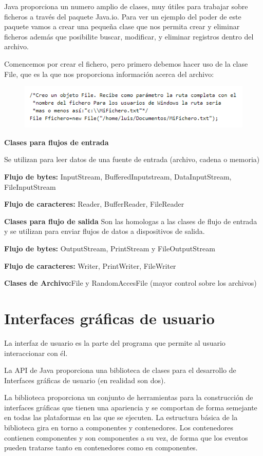 \documentclass[12pt,a4paper]{report}
\begin{document}
{Java proporciona un numero amplio de clases, muy útiles para trabajar sobre ficheros a través del paquete Java.io. Para ver un ejemplo del poder de este paquete vamos a crear una pequeña clase que nos permita crear y eliminar  ficheros además que posibilite buscar, modificar, y eliminar registros dentro del archivo.

Comencemos por crear el fichero, pero primero debemos hacer uso de la clase File, que es la que nos proporciona información acerca del archivo: 
\begin{figure}[hbtp]
\centering
\includegraphics[scale=1]{archivo.PNG}
\end{figure}

\textbf{Clases para flujos de entrada }

Se utilizan para leer datos de una fuente de entrada (archivo, cadena o memoria)

\textbf{Flujo de bytes:} InputStream, BufferedInputstream, DataInputStream, FileInputStream

\textbf{Flujo de caracteres:} Reader, BufferReader, FileReader
\bigskip 

\textbf{Clases para flujo de salida}
Son las homologas a las clases de flujo de entrada y se utilizan para enviar flujos de datos a dispositivos de salida.

\textbf{Flujo de bytes:} OutputStream, PrintStream y FileOutputStream

\textbf{Flujo de caracteres:} Writer, PrintWriter, FileWriter

\textbf{Clases de Archivo:}File y RandomAccesFile (mayor control sobre los archivos)

\section*{Interfaces gráficas de usuario}
La interfaz de usuario es la parte del programa que permite al usuario interaccionar con él. 

La API de Java proporciona una biblioteca de clases para el desarrollo de Interfaces gráficas de usuario (en realidad son dos). 

La biblioteca proporciona un conjunto de herramientas para la construcción de interfaces gráficas que tienen una apariencia y se comportan de forma semejante en todas las plataformas en las que se ejecuten.
 La estructura básica de la biblioteca gira en torno a componentes y contenedores. Los contenedores contienen componentes y son componentes a su vez, de forma que los eventos pueden tratarse tanto en contenedores como en componentes. 
 
}
\end{document}
